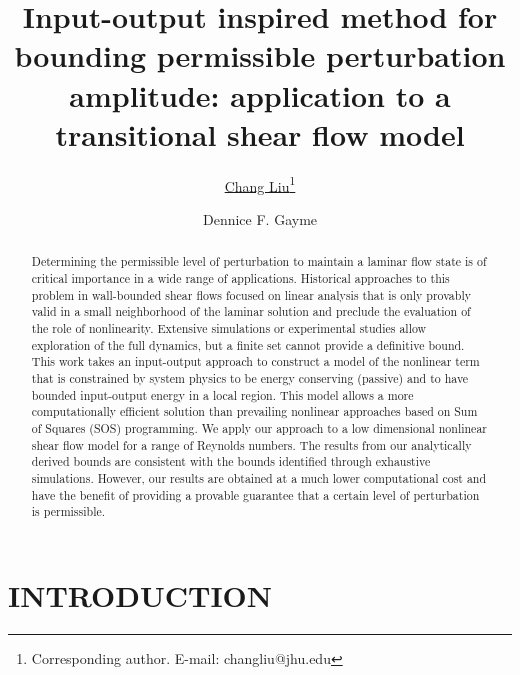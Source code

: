 \documentclass[10pt, a4paper]{article}
\begin{document}
\title{Input-output inspired method for bounding permissible perturbation amplitude: application to a transitional shear flow model}

\author[1]{\underline{Chang Liu}{\footnote{Corresponding author. E-mail: changliu@jhu.edu}}}
\author[1]{{Dennice F. Gayme}} 

\maketitle
\vspace{-3mm}

\begin{abstract}
Determining the permissible level of perturbation to maintain a laminar flow state is of critical importance in a wide range of applications. Historical approaches to this problem in wall-bounded shear flows focused on linear analysis that is only provably valid in a small neighborhood of the laminar solution and preclude the evaluation of the role of nonlinearity. Extensive simulations or experimental studies allow exploration of the full dynamics, but a finite set cannot provide a definitive bound. This work takes an input-output approach to construct a model of the nonlinear term that is constrained by system physics to be energy conserving (passive) and to have bounded input-output energy in a local region. This model allows a more computationally efficient solution than prevailing nonlinear approaches based on Sum of Squares (SOS) programming. We apply our approach to a low dimensional nonlinear shear flow model for a range of Reynolds numbers. The results from our analytically derived bounds are consistent with the bounds identified through exhaustive simulations. However, our results are obtained at a much lower computational cost and have the benefit of providing a provable guarantee that a certain level of perturbation is permissible.
\end{abstract}

\vspace{-6mm}
\section{INTRODUCTION}
\label{sec:introduction}
\vspace{-2mm}
\end{document}
